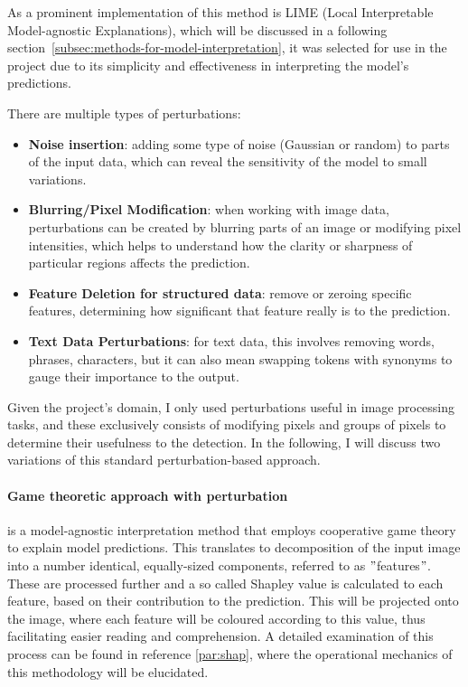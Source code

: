 As a prominent implementation of this method is LIME (Local Interpretable Model-agnostic Explanations), which will be discussed in a following section~\ref{subsec:methods-for-model-interpretation}, it was selected
for use in the project due to its simplicity and effectiveness in interpreting the model's predictions.


There are multiple types of perturbations:
\begin{itemize}
    \item \textbf{Noise insertion}: adding some type of noise (Gaussian or random) to parts of the input data,
    which can reveal the sensitivity of the model to small variations.
    \item \textbf{Blurring/Pixel Modification}: when working with image data, perturbations can be created by blurring parts of an image or modifying pixel intensities, which helps to understand how the clarity or sharpness of particular regions affects the prediction.
    \item \textbf{Feature Deletion for structured data}: remove or zeroing specific features, determining how significant that feature really is to the prediction.
    \item \textbf{Text Data Perturbations}: for text data, this involves removing words, phrases, characters, but it can also mean swapping tokens with synonyms to gauge their importance to the output.
\end{itemize}

Given the project's domain, I only used perturbations useful in image processing tasks, and these exclusively consists of modifying pixels and groups of pixels to determine their usefulness to the detection.
In the following, I will discuss two variations of this standard perturbation-based approach.

\paragraph{Game theoretic approach with perturbation}\label{par:game-theoretic-approach-with-pertubation}

 is a model-agnostic interpretation method that employs cooperative game theory to explain model predictions.
This translates to decomposition of the input image into a number identical, equally-sized components, referred to as \("\)features\("\).
These are processed further and a so called Shapley value is calculated to each feature, based on their contribution to the prediction.
This will be projected onto the image, where each feature will be coloured according to this value, thus facilitating easier reading and comprehension.
A detailed examination of this process can be found in reference \ref{par:shap}, where the operational mechanics of this methodology will be elucidated.

